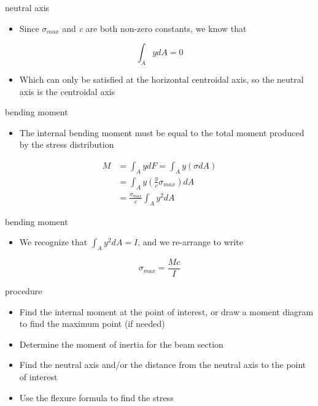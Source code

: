 \begin{frame}{neutral axis}
\protect\hypertarget{neutral-axis-2}{}
\begin{itemize}
\tightlist
\item
  Since \(\sigma_{max}\) and \emph{c} are both non-zero constants, we
  know that
\end{itemize}

\[ \int_A y dA = 0\]

\begin{itemize}
\tightlist
\item
  Which can only be satisfied at the horizontal centroidal axis, so the
  neutral axis is the centroidal axis
\end{itemize}
\end{frame}

\begin{frame}{bending moment}
\protect\hypertarget{bending-moment}{}
\begin{itemize}
\tightlist
\item
  The internal bending moment must be equal to the total moment produced
  by the stress distribution
\end{itemize}

\[\begin{aligned}
  M &= \int_A y dF = \int_A y (\sigma dA) \\
  &= \int_A y \left( \frac{y}{c} \sigma_{max} \right) dA \\
  &= \frac{\sigma_{max}}{c} \int_A y^2 dA
\end{aligned}\]
\end{frame}

\begin{frame}{bending moment}
\protect\hypertarget{bending-moment-1}{}
\begin{itemize}
\tightlist
\item
  We recognize that \(\int_A y^2 dA = I\), and we re-arrange to write
\end{itemize}

\[\sigma_{max} = \frac{Mc}{I}\]
\end{frame}

\begin{frame}{procedure}
\protect\hypertarget{procedure}{}
\begin{itemize}
\tightlist
\item
  Find the internal moment at the point of interest, or draw a moment
  diagram to find the maximum point (if needed)
\item
  Determine the moment of inertia for the beam section
\item
  Find the neutral axis and/or the distance from the neutral axis to the
  point of interest
\item
  Use the flexure formula to find the stress
\end{itemize}
\end{frame}

